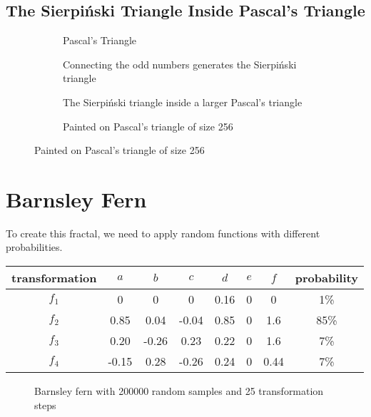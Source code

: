 \documentclass[12pt,a4paper]{article}
\newcommand{\figpath}{../fig}
\begin{document}
    \subsection{The Sierpiński Triangle Inside Pascal's Triangle}
    \begin{figure}
        \centering
        \begin{subfigure}{0.4\linewidth}
            \centering
            \caption{Pascal's Triangle}
        \end{subfigure}
        \begin{subfigure}{0.4\linewidth}
            \centering
            \caption{Connecting the odd numbers generates the Sierpiński triangle}
        \end{subfigure}
        \begin{subfigure}{0.4\linewidth}
            \centering
            \caption{The Sierpiński triangle inside a larger Pascal's triangle}
        \end{subfigure}
        \begin{subfigure}{0.4\linewidth}
            \centering
            \caption{Painted on Pascal's triangle of size 256}
        \end{subfigure}
    \end{figure}
    \FloatBarrier
    \restoregeometry
    \section{Barnsley Fern}
    To create this fractal, we need to apply random functions with different probabilities.
    \begin{table}
        \centering
        \begin{tabular}{|c|c|c|c|c|c|c|c|}
            \hline
            transformation & $a$ & $b$ & $c$ & $d$ & $e$ & $f$ & probability \\
            \hline
            $f_1$ & 0 & 0 & 0 & 0.16 & 0 & 0 & 1\% \\
            \hline
            $f_2$ & 0.85 & 0.04 & -0.04 & 0.85 & 0 & 1.6 & 85\% \\
            \hline
            $f_3$ & 0.20 & -0.26 & 0.23 & 0.22 & 0 & 1.6 & 7\% \\
            \hline
            $f_4$ & -0.15 & 0.28 & -0.26 & 0.24 & 0 & 0.44 & 7\% \\
            \hline
        \end{tabular}
    \end{table}
    \thispagestyle{empty}
    \begin{figure}
        \centering
        \caption{Barnsley fern with 200000 random samples and 25 transformation steps}
    \end{figure}
\end{document}
